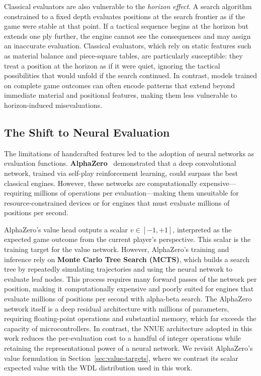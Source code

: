 Classical evaluators are also vulnerable to the \emph{horizon effect}. A search algorithm constrained to a fixed depth evaluates positions at the search frontier as if the game were stable at that point. If a tactical sequence begins at the horizon but extends one ply further, the engine cannot see the consequences and may assign an inaccurate evaluation. Classical evaluators, which rely on static features such as material balance and piece-square tables, are particularly susceptible: they treat a position at the horizon as if it were quiet, ignoring the tactical possibilities that would unfold if the search continued. In contrast, models trained on complete game outcomes can often encode patterns that extend beyond immediate material and positional features, making them less vulnerable to horizon-induced misevaluations.

\subsection{The Shift to Neural Evaluation}\label{sec:neural-eval}

The limitations of handcrafted features led to the adoption of neural networks as evaluation functions. \textbf{AlphaZero}~\cite{silver2018alphazero} demonstrated that a deep convolutional network, trained via self-play reinforcement learning, could surpass the best classical engines. However, these networks are computationally expensive---requiring millions of operations per evaluation---making them unsuitable for resource-constrained devices or for engines that must evaluate millions of positions per second.

AlphaZero's value head outputs a scalar \(v \in [-1,+1]\), interpreted as the expected game outcome from the current player's perspective. This scalar is the training target for the value network. However, AlphaZero's training and inference rely on \textbf{Monte Carlo Tree Search (MCTS)}, which builds a search tree by repeatedly simulating trajectories and using the neural network to evaluate leaf nodes. This process requires many forward passes of the network per position, making it computationally expensive and poorly suited for engines that evaluate millions of positions per second with alpha-beta search. The AlphaZero network itself is a deep residual architecture with millions of parameters, requiring floating-point operations and substantial memory, which far exceeds the capacity of microcontrollers. In contrast, the NNUE architecture adopted in this work reduces the per-evaluation cost to a handful of integer operations while retaining the representational power of a neural network. We revisit AlphaZero's value formulation in Section~\ref{sec:value-targets}, where we contrast its scalar expected value with the WDL distribution used in this work.


